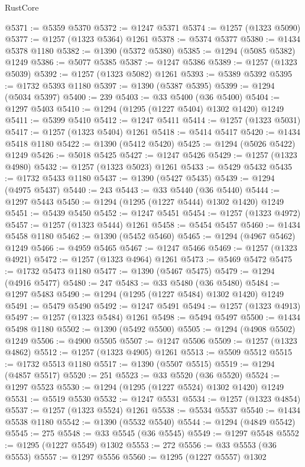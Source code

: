 \begin{lexlean}{RustCore}
\begin{coremodule}
@5371 := @5359 @5370
@5372 := @1247 @5371
@5374 := @1257 (@1323 @5090)
@5377 := @1257 (@1323 @5364) @1261
@5378 := @5374 @5377
@5380 := @1434 @5378 @1180
@5382 := @1390 (@5372 @5380)
@5385 := @1294 (@5085 @5382) @1249
@5386 := @5077 @5385
@5387 := @1247 @5386
@5389 := @1257 (@1323 @5039)
@5392 := @1257 (@1323 @5082) @1261
@5393 := @5389 @5392
@5395 := @1732 @5393 @1180
@5397 := @1390 (@5387 @5395)
@5399 := @1294 (@5034 @5397)
@5400 := 239
@5403 := @33 @5400 (@36 @5400)
@5404 := @1297 @5403
@5410 := @1294 (@1295 (@1227 @5404) @1302 @1420) @1249
@5411 := @5399 @5410
@5412 := @1247 @5411
@5414 := @1257 (@1323 @5031)
@5417 := @1257 (@1323 @5404) @1261
@5418 := @5414 @5417
@5420 := @1434 @5418 @1180
@5422 := @1390 (@5412 @5420)
@5425 := @1294 (@5026 @5422) @1249
@5426 := @5018 @5425
@5427 := @1247 @5426
@5429 := @1257 (@1323 @4980)
@5432 := @1257 (@1323 @5023) @1261
@5433 := @5429 @5432
@5435 := @1732 @5433 @1180
@5437 := @1390 (@5427 @5435)
@5439 := @1294 (@4975 @5437)
@5440 := 243
@5443 := @33 @5440 (@36 @5440)
@5444 := @1297 @5443
@5450 := @1294 (@1295 (@1227 @5444) @1302 @1420) @1249
@5451 := @5439 @5450
@5452 := @1247 @5451
@5454 := @1257 (@1323 @4972)
@5457 := @1257 (@1323 @5444) @1261
@5458 := @5454 @5457
@5460 := @1434 @5458 @1180
@5462 := @1390 (@5452 @5460)
@5465 := @1294 (@4967 @5462) @1249
@5466 := @4959 @5465
@5467 := @1247 @5466
@5469 := @1257 (@1323 @4921)
@5472 := @1257 (@1323 @4964) @1261
@5473 := @5469 @5472
@5475 := @1732 @5473 @1180
@5477 := @1390 (@5467 @5475)
@5479 := @1294 (@4916 @5477)
@5480 := 247
@5483 := @33 @5480 (@36 @5480)
@5484 := @1297 @5483
@5490 := @1294 (@1295 (@1227 @5484) @1302 @1420) @1249
@5491 := @5479 @5490
@5492 := @1247 @5491
@5494 := @1257 (@1323 @4913)
@5497 := @1257 (@1323 @5484) @1261
@5498 := @5494 @5497
@5500 := @1434 @5498 @1180
@5502 := @1390 (@5492 @5500)
@5505 := @1294 (@4908 @5502) @1249
@5506 := @4900 @5505
@5507 := @1247 @5506
@5509 := @1257 (@1323 @4862)
@5512 := @1257 (@1323 @4905) @1261
@5513 := @5509 @5512
@5515 := @1732 @5513 @1180
@5517 := @1390 (@5507 @5515)
@5519 := @1294 (@4857 @5517)
@5520 := 251
@5523 := @33 @5520 (@36 @5520)
@5524 := @1297 @5523
@5530 := @1294 (@1295 (@1227 @5524) @1302 @1420) @1249
@5531 := @5519 @5530
@5532 := @1247 @5531
@5534 := @1257 (@1323 @4854)
@5537 := @1257 (@1323 @5524) @1261
@5538 := @5534 @5537
@5540 := @1434 @5538 @1180
@5542 := @1390 (@5532 @5540)
@5544 := @1294 (@4849 @5542)
@5545 := 275
@5548 := @33 @5545 (@36 @5545)
@5549 := @1297 @5548
@5552 := @1295 (@1227 @5549) @1302
@5553 := 272
@5556 := @33 @5553 (@36 @5553)
@5557 := @1297 @5556
@5560 := @1295 (@1227 @5557) @1302

\end{coremodule}
\end{lexlean}
